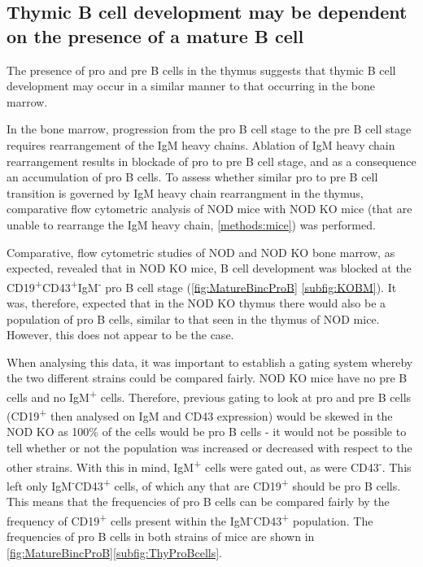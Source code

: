 \subsection{Thymic B cell development may be dependent on the presence of a mature B cell}


The presence of pro and pre B cells in the thymus suggests that thymic B cell development may occur in a similar manner to that occurring in the bone marrow.

In the bone marrow, progression from the pro B cell stage to the pre B cell stage requires rearrangement of the IgM heavy chains.
Ablation of IgM heavy chain rearrangement results in blockade of pro to pre B cell stage, and as a consequence an accumulation of pro B cells.
To assess whether similar pro to pre B cell transition is governed by IgM heavy chain rearrangment in the thymus, comparative flow cytometric analysis of NOD mice with NOD KO mice (that are unable to rearrange the IgM heavy chain, \cref{methods:mice}) was performed. 

Comparative, flow cytometric studies of NOD and NOD KO bone marrow, as expected, revealed that in NOD KO mice, B cell development was blocked at the CD19\textsuperscript{+}CD43\textsuperscript{+}IgM\textsuperscript{-} pro B cell stage (\cref{fig:MatureBincProB} \ref{subfig:KOBM}).
It was, therefore, expected that in the NOD KO thymus there would also be a population of pro B cells, similar to that seen in the thymus of NOD mice. 
However, this does not appear to be the case.

When analysing this data, it was important to establish a gating system whereby the two different strains could be compared fairly.
NOD KO mice have no pre B cells and no IgM\textsuperscript{+} cells. Therefore, previous gating to look at pro and pre B cells (CD19\textsuperscript{+} then analysed on IgM and CD43 expression) would be skewed in the NOD KO as 100\% of the cells would be pro B cells - it would not be possible to tell whether or not the population was increased or decreased with respect to the other strains.
With this in mind, IgM\textsuperscript{+} cells were gated out, as were CD43\textsuperscript{-}.
This left only IgM\textsuperscript{-}CD43\textsuperscript{+} cells, of which any that are CD19\textsuperscript{+} should be pro B cells.
This means that the frequencies of pro B cells can be compared fairly by the frequency of CD19\textsuperscript{+} cells present within the IgM\textsuperscript{-}CD43\textsuperscript{+} population.
The frequencies of pro B cells in both strains of mice are shown in \cref{fig:MatureBincProB}\ref{subfig:ThyProBcells}.


